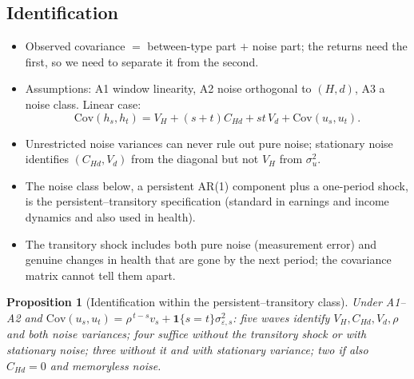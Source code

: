 \documentclass[11pt]{article}
\newtheorem{proposition}{Proposition}
\newcommand{\Cov}{\mathrm{Cov}}
\begin{document}
\subsection{Identification}
\label{sec:ident_fw}
\begin{itemize}
	\item Observed covariance $=$ between-type part $+$ noise part; the returns need the first, so we need to separate it from the second. 
	\item Assumptions: A1 window linearity, A2 noise orthogonal to $(H,d)$, A3 a noise class. Linear case:
	\begin{equation}
		\Cov(h_s,h_t)=V_H+(s+t)C_{Hd}+st\,V_d+\Cov(u_s,u_t).
		\label{eq:forward}
	\end{equation}
	\item Unrestricted noise variances can never rule out pure noise; stationary noise identifies $(C_{Hd},V_d)$ from the diagonal but not $V_H$ from $\sigma^2_u$.
	\item The noise class below, a persistent AR(1) component plus a one-period shock, is the persistent--transitory specification (standard in earnings and income dynamics and also used in health).  %
	\item The transitory shock includes both pure noise (measurement error) and genuine changes in health that are gone by the next period; the covariance matrix cannot tell them apart.
\end{itemize}


\begin{proposition}[Identification within the persistent--transitory class]\label{prop:main}
	Under A1--A2 and $\Cov(u_s,u_t)=\rho^{\,t-s}v_s+\mathbf 1\{s=t\}\sigma^2_{\varepsilon,s}$: five waves identify $V_H,C_{Hd},V_d,\rho$ and both noise variances; four suffice without the transitory shock or with stationary noise; three without it and with stationary variance; two if also $C_{Hd}=0$ and memoryless noise.
\end{proposition}
\end{document}

